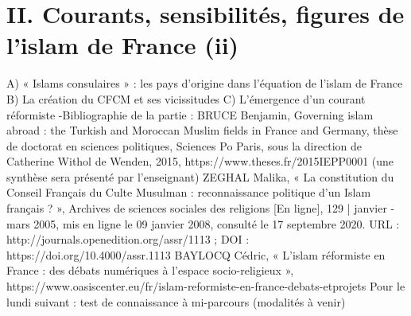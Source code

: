 
\chapter{II. Courants, sensibilités, figures de l’islam de France (ii)}



A) « Islams consulaires » : les pays d’origine dans l’équation de l’islam de
France
B) La création du CFCM et ses vicissitudes
C) L’émergence d’un courant réformiste
-Bibliographie de la partie :
BRUCE Benjamin, Governing islam abroad : the Turkish and Moroccan Muslim fields
in France and Germany, thèse de doctorat en sciences politiques, Sciences Po Paris,
sous la direction de Catherine Withol de Wenden, 2015,
https://www.theses.fr/2015IEPP0001 (une synthèse sera présenté par l’enseignant)
ZEGHAL Malika, « La constitution du Conseil Français du Culte Musulman :
reconnaissance politique d'un Islam français ? », Archives de sciences sociales des
religions [En ligne], 129 | janvier - mars 2005, mis en ligne le 09 janvier 2008, consulté
le 17 septembre 2020. URL : http://journals.openedition.org/assr/1113 ; DOI :
https://doi.org/10.4000/assr.1113
BAYLOCQ Cédric, « L’islam réformiste en France : des débats numériques à l’espace
socio-religieux », https://www.oasiscenter.eu/fr/islam-reformiste-en-france-debats-etprojets
Pour le lundi suivant : test de connaissance à mi-parcours (modalités à venir)